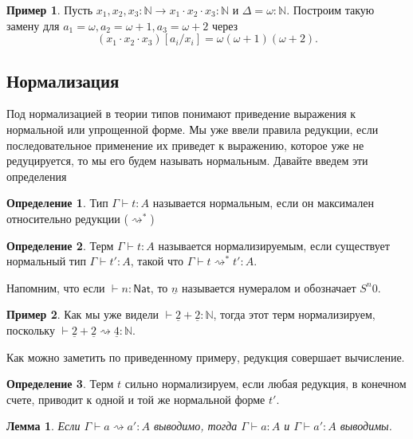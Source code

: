 \documentclass[openany]{book}
\theoremstyle{plain}
\newtheorem{lem}[thm]{Лемма}
\theoremstyle{definition}
\newtheorem{defn}{Определение}[section]
\newtheorem{eg}{Пример}[]
\newcommand{\N}{\mathbb{N}}
\newcommand{\nat}{\mathsf{Nat}}
\begin{document}
\begin{eg}
Пусть \(x_1, x_2, x_3 : \N \to x_1 \cdot x_2 \cdot x_3 : \N\) и \(\Delta = \omega : \N\). Построим такую замену для \(a_1 = \omega, a_2 = \omega + 1, a_3 = \omega + 2\) через \[(x_1 \cdot x_2 \cdot x_3)[a_i/x_i] = \omega (\omega + 1)(\omega + 2).\]
\end{eg}

\subsection{Нормализация}

Под нормализацией в теории типов понимают приведение выражения к нормальной или упрощенной форме. Мы уже ввели правила редукции, если последовательное применение их приведет к выражению, которое уже не редуцируется, то мы его будем называть нормальным. Давайте введем эти определения
\begin{defn}
Тип \(\Gamma \vdash t: A\) называется нормальным, если он максимален относительно редукции (\(\rightsquigarrow^*\))
\end{defn}

\begin{defn}
Терм \(\Gamma \vdash t: A\) называется нормализируемым, если существует нормальный тип \(\Gamma \vdash t' : A\), такой что \(\Gamma \vdash t \rightsquigarrow^* t' : A\).
\end{defn}

Напомним, что если \(\vdash n : \nat\), то \(\underline{n}\) называется нумералом и обозначает \(S^n 0\).

\begin{eg}
Как мы уже видели \(\vdash \underline{2} + \underline{2} : \N\), тогда этот терм нормализируем, поскольку \(\vdash \underline{2} + \underline{2} \rightsquigarrow \underline{4} : \N\).
\end{eg}

Как можно заметить по приведенному примеру, редукция совершает вычисление.

\begin{defn}
Терм \(t\) сильно нормализируем, если любая редукция, в конечном счете, приводит к одной и той же нормальной форме \(t'\).
\end{defn}

\begin{lem}
Если \(\Gamma \vdash a \rightsquigarrow a' : A\) выводимо, тогда \(\Gamma \vdash a : A\) и \(\Gamma \vdash a' : A\) выводимы.
\end{lem}
\end{document}
